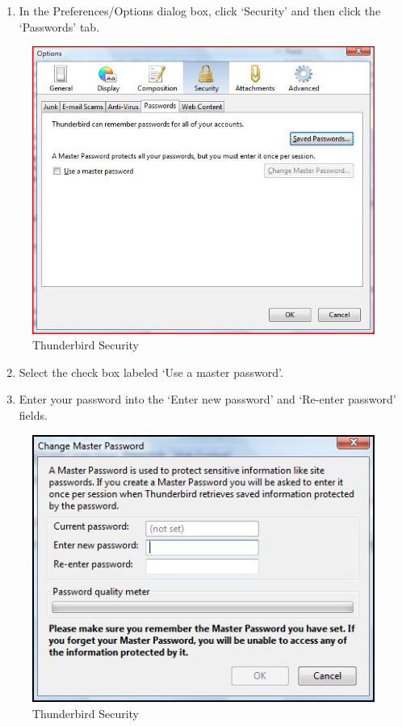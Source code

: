 \begin{enumerate}[1.]
\item
  In the Preferences/Options dialog box, click `Security' and then click
  the `Passwords' tab.
\end{enumerate}
\begin{figure}[htbp]
\centering
\includegraphics{thunderbird_sec_4.jpg}
\caption{Thunderbird Security}
\end{figure}

\begin{enumerate}[1.]
\setcounter{enumi}{1}
\item
  Select the check box labeled `Use a master password'.
\item
  Enter your password into the `Enter new password' and `Re-enter
  password' fields.
\end{enumerate}
\begin{figure}[htbp]
\centering
\includegraphics{thunderbird_sec_5.jpg}
\caption{Thunderbird Security}
\end{figure}

